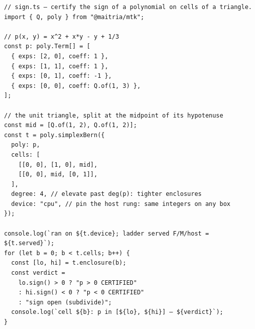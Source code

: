 \begin{Verbatim}[fontsize=\small,frame=leftline,rulecolor=\color{accentmid},framesep=3mm,xleftmargin=3mm]
// sign.ts — certify the sign of a polynomial on cells of a triangle.
import { Q, poly } from "@maitria/mtk";

// p(x, y) = x^2 + x*y - y + 1/3
const p: poly.Term[] = [
  { exps: [2, 0], coeff: 1 },
  { exps: [1, 1], coeff: 1 },
  { exps: [0, 1], coeff: -1 },
  { exps: [0, 0], coeff: Q.of(1, 3) },
];

// the unit triangle, split at the midpoint of its hypotenuse
const mid = [Q.of(1, 2), Q.of(1, 2)];
const t = poly.simplexBern({
  poly: p,
  cells: [
    [[0, 0], [1, 0], mid],
    [[0, 0], mid, [0, 1]],
  ],
  degree: 4, // elevate past deg(p): tighter enclosures
  device: "cpu", // pin the host rung: same integers on any box
});

console.log(`ran on ${t.device}; ladder served F/M/host = ${t.served}`);
for (let b = 0; b < t.cells; b++) {
  const [lo, hi] = t.enclosure(b);
  const verdict =
    lo.sign() > 0 ? "p > 0 CERTIFIED"
    : hi.sign() < 0 ? "p < 0 CERTIFIED"
    : "sign open (subdivide)";
  console.log(`cell ${b}: p in [${lo}, ${hi}] — ${verdict}`);
}
\end{Verbatim}
